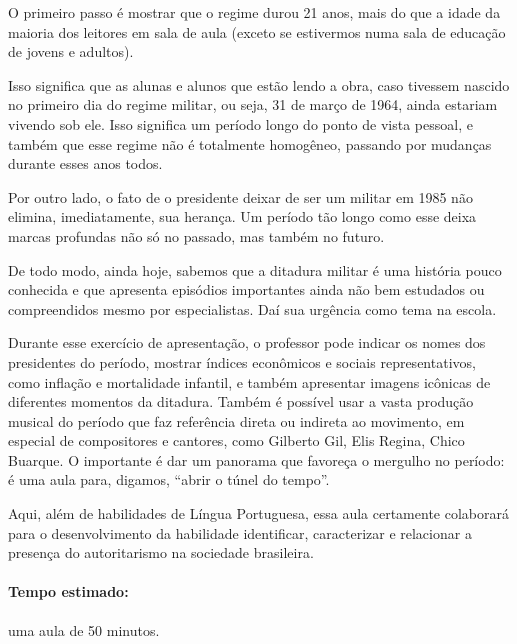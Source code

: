 \documentclass[12pt]{extarticle}
\begin{document}
O primeiro passo é mostrar que o regime durou 21 anos, mais do que a
idade da maioria dos leitores em sala de aula (exceto se estivermos numa
sala de educação de jovens e adultos).

Isso significa que as alunas e alunos que estão lendo a obra, caso
tivessem nascido no primeiro dia do regime militar, ou seja, 31 de março
de 1964, ainda estariam vivendo sob ele. Isso significa um período longo
do ponto de vista pessoal, e também que esse regime não é totalmente
homogêneo, passando por mudanças durante esses anos todos.



Por outro lado, o fato de o presidente deixar de ser um militar em 1985
não elimina, imediatamente, sua herança. Um período tão longo como esse
deixa marcas profundas não só no passado, mas também no futuro.

De todo modo, ainda hoje, sabemos que a ditadura militar é uma história
pouco conhecida e que apresenta episódios importantes ainda não bem
estudados ou compreendidos mesmo por especialistas. Daí sua urgência
como tema na escola.

Durante esse exercício de apresentação, o professor pode indicar os
nomes dos presidentes do período, mostrar índices econômicos e sociais
representativos, como inflação e mortalidade infantil, e também
apresentar imagens icônicas de diferentes momentos da ditadura. Também é
possível usar a vasta produção musical do período que faz referência
direta ou indireta ao movimento, em especial de compositores e cantores,
como Gilberto Gil, Elis Regina, Chico Buarque. O importante é dar um
panorama que favoreça o mergulho no período: é uma aula para, digamos,
``abrir o túnel do tempo''.

Aqui, além de habilidades de Língua Portuguesa, essa aula certamente colaborará para o desenvolvimento da habilidade identificar, caracterizar e relacionar a presença do autoritarismo na sociedade brasileira.




\paragraph{Tempo estimado:} uma aula de 50 minutos.
\end{document}
